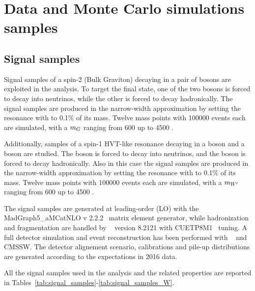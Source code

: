 \section{Data and Monte Carlo simulations samples}
\label{chap:samples}

\subsection{Signal samples}

Signal samples of a spin-2 (Bulk Graviton) decaying in a pair of \Z bosons are exploited in the analysis. To target the final state, one of the two \Z bosons is forced to decay into neutrinos, while the other \Z is forced to decay hadronically. The signal samples are produced in the narrow-width approximation by setting the resonance with to 0.1\% of its mass. Twelve mass points with 100000 events each are simulated, with a $m_{G}$ ranging from 600 \GeV up to 4500 \GeV.

\noindent Additionally, samples of a spin-1 HVT-like \Wp resonance decaying in a \Z boson and a \W boson are studied. The \Z boson is forced to decay into neutrinos, and the \W boson is forced to decay hadronically. Also in this case the signal samples are produced in the narrow-width approximation by setting the resonance with to 0.1\% of its mass. Twelve mass points with 100000 events each are simulated, with a $m_{W'}$ ranging from 600 \GeV up to 4500 \GeV.

\noindent The signal samples are generated at leading-order (LO) with the {\sc MadGraph5\_aMCatNLO v 2.2.2}~\cite{bib:MADGRAPH} matrix element generator, while hadronization and fragmentation are handled by ~\cite{bib:PYTHIA} version 8.2121 with CUETP8M1~\cite{bib:CUETP8M1} tuning. A full detector simulation and event reconstruction has been performed with \GEANTfour~\cite{bib:GEANT4} and CMSSW. The detector alignement scenario, calibrations and pile-up distributions are generated according to the expectations in 2016 data.

\noindent All the signal samples used in the analysis and the related properties are reported in Tables~\ref{tab:signal_samples}-\ref{tab:signal_samples_W}.
 
